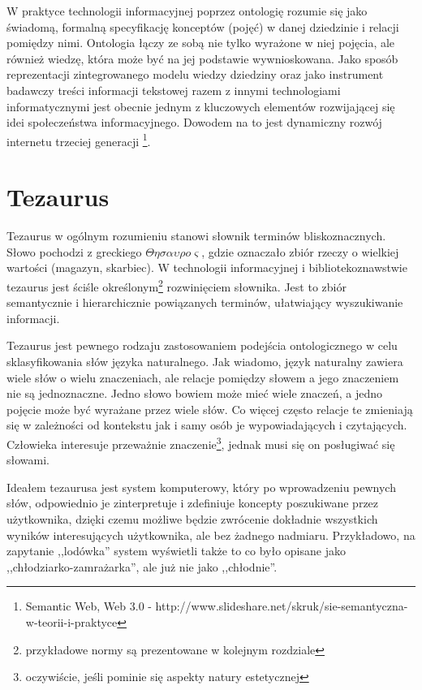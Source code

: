 W praktyce technologii informacyjnej poprzez ontologię rozumie się jako  świadomą, formalną 
specyfikację konceptów (pojęć) w danej dziedzinie i relacji pomiędzy nimi. Ontologia łączy ze sobą nie tylko wyrażone w niej pojęcia, ale również wiedzę, która może być na jej podstawie wywnioskowana. Jako sposób reprezentacji zintegrowanego  modelu wiedzy dziedziny oraz jako instrument badawczy treści informacji tekstowej razem z innymi technologiami informatycznymi jest obecnie jednym z kluczowych elementów 
rozwijającej się idei społeczeństwa informacyjnego. Dowodem na to jest dynamiczny rozwój internetu trzeciej generacji \footnote{Semantic Web, Web 3.0 - http://www.slideshare.net/skruk/sie-semantyczna-w-teorii-i-praktyce}. 
 
\section{Tezaurus}
Tezaurus w ogólnym rozumieniu stanowi słownik terminów bliskoznacznych. Słowo pochodzi z greckiego $\Theta \eta \sigma \alpha \upsilon \rho o \varsigma$, gdzie oznaczało zbiór rzeczy o wielkiej wartości (magazyn, skarbiec). W technologii informacyjnej i bibliotekoznawstwie tezaurus jest ściśle określonym\footnote{przykładowe normy są prezentowane w kolejnym rozdziale}  rozwinięciem słownika. Jest to zbiór semantycznie i hierarchicznie powiązanych terminów, ułatwiający wyszukiwanie informacji. 

Tezaurus jest pewnego rodzaju zastosowaniem podejścia ontologicznego w celu sklasyfikowania słów języka naturalnego. Jak wiadomo, język naturalny zawiera wiele słów o wielu znaczeniach, ale relacje pomiędzy słowem a jego znaczeniem nie są jednoznaczne. Jedno słowo bowiem może mieć wiele znaczeń, a jedno pojęcie może być wyrażane przez wiele słów. Co więcej często relacje te zmieniają się w zależności od kontekstu jak i samy osób je wypowiadających i czytających. Człowieka interesuje przeważnie znaczenie\footnote{oczywiście, jeśli pominie się aspekty natury estetycznej}, jednak musi się on posługiwać się słowami. 

Ideałem tezaurusa jest system komputerowy, który po wprowadzeniu pewnych słów, odpowiednio je zinterpretuje i zdefiniuje koncepty poszukiwane przez użytkownika, dzięki czemu możliwe będzie zwrócenie dokładnie wszystkich wyników interesujących użytkownika, ale bez żadnego nadmiaru. Przykładowo, na zapytanie ,,lodówka'' system wyświetli także to co było opisane jako ,,chłodziarko-zamrażarka'', ale już nie jako ,,chłodnie''. 

